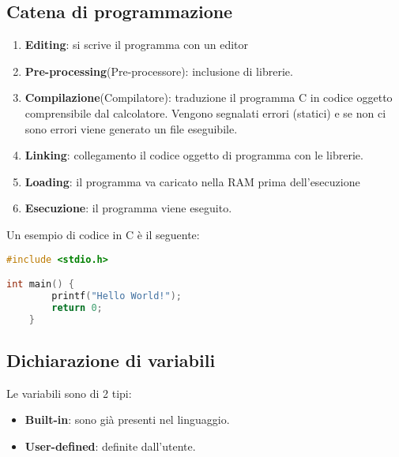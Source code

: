 \documentclass[a4paper]{article}
\theoremstyle{break}
\theoremstyle{break}
\theoremstyle{break}
\theoremstyle{break}
\begin{document}
\subsection{Catena di programmazione}
\begin{enumerate}
	\item \textbf{Editing}: si scrive il programma con un editor
	\item \textbf{Pre-processing}(Pre-processore): inclusione di librerie.
	\item \textbf{Compilazione}(Compilatore): traduzione il programma C in
	      codice oggetto comprensibile dal calcolatore. Vengono segnalati
	      errori (statici) e se non ci sono errori viene generato un file eseguibile.
	\item \textbf{Linking}: collegamento il codice oggetto di programma con
	      le librerie.
	\item \textbf{Loading}: il programma va caricato nella RAM prima dell'esecuzione
	\item \textbf{Esecuzione}: il programma viene eseguito.
\end{enumerate}
Un esempio di codice in C è il seguente:
\begin{lstlisting}[language=C]
#include <stdio.h>

int main() {
		printf("Hello World!");
		return 0;
	}
\end{lstlisting}

\subsection{Dichiarazione di variabili}
Le variabili sono di 2 tipi:
\begin{itemize}
	\item \textbf{Built-in}: sono già presenti nel linguaggio.
	\item \textbf{User-defined}: definite dall'utente.
\end{itemize}
\end{document}
